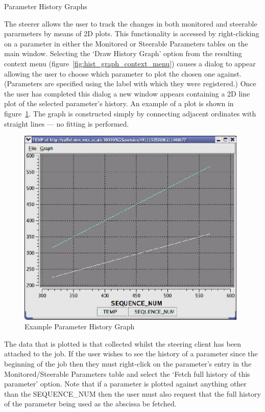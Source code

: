 \documentclass[a4paper,twoside]{article}
\begin{document}

\begin{section}{Parameter History Graphs}
\label{sec:hist_graphs}

The steerer allows the user to track the changes in both monitored and
steerable pararmeters by means of 2D plots.  This functionality is
accessed by right-clicking on a parameter in either the Monitored or
Steerable Parameters tables on the main window.  Selecting the `Draw
History Graph' option from the resulting context menu
(figure~\ref{fig:hist_graph_context_menu}) causes a dialog to appear allowing
the user to choose which parameter to plot the chosen one against.
(Parameters are specified using the label with which they were
registered.)  Once the user has completed this dialog a new window
appears containing a 2D line plot of the selected parameter's
history. An example of a plot is shown in
figure~\ref{fig:eg_param_hist_plot}.  The graph is constructed simply
by connecting adjacent ordinates with straight lines --- no fitting is
performed.

\begin{figure}
\centerline{\includegraphics[width=11cm]{hist_plot_2curves.eps}}
\caption{Example Parameter History Graph}
\label{fig:eg_param_hist_plot}
\end{figure}

The data that is plotted is that collected whilst the steering client
has been attached to the job. If the user wishes to see the history of
a parameter since the beginning of the job then they must right-click
on the parameter's entry in the Monitored/Steerable Parameters table
and select the `Fetch full history of this parameter' option.  Note
that if a parameter is plotted against anything other than the
SEQUENCE\_NUM then the user must also request that the full history of
the parameter being used as the abscissa be fetched.


\end{section}
\end{document}
